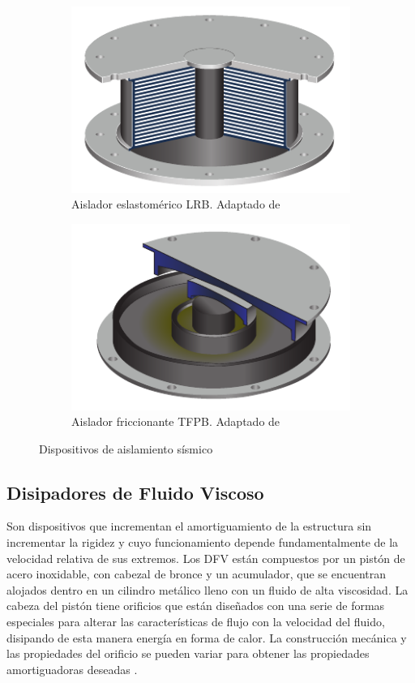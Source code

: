 	\begin{figure}[!h]
	\centering
	\begin{subfigure}[b]{0.45\textwidth}
  	\centering
  	\includegraphics[scale=1]{E_IMAGENES/1_Capitulo2/Cap2_Imagen1a.pdf}
 	\caption{\centering\footnotesize Aislador eslastomérico LRB. Adaptado de \citet{Bridgestone2015}}
  	\label{Cap2_Figura1a}
	\end{subfigure}
	\hfill
	\begin{subfigure}[b]{0.45\textwidth}
  	\centering
  	\includegraphics[scale=1]{E_IMAGENES/1_Capitulo2/Cap2_Imagen1b.pdf} 
  	\caption{\centering\footnotesize Aislador friccionante TFPB. Adaptado de \citet{Fenz2008}}
  	\label{Cap2_Figura1b}
	\end{subfigure}
	\caption[Dispositivos de aislamiento sísmico]{\centering\footnotesize Dispositivos de aislamiento sísmico}
	\label{Cap2_Figura1}
	\end{figure}
	
	\subsection{Disipadores de Fluido Viscoso}
Son dispositivos que incrementan el amortiguamiento de la estructura sin incrementar la rigidez y cuyo funcionamiento depende fundamentalmente de la velocidad relativa de sus extremos. Los DFV están compuestos por un pistón de acero inoxidable, con cabezal de bronce y un acumulador, que se encuentran alojados dentro en un cilindro metálico lleno con un fluido de alta viscosidad. La cabeza del pistón tiene orificios que están diseñados con una serie de formas especiales para alterar las características de flujo con la velocidad del fluido, disipando de esta manera energía en forma de calor. La construcción mecánica y las propiedades del orificio se pueden variar para obtener las propiedades amortiguadoras deseadas \citep{Constantinou1993}.


